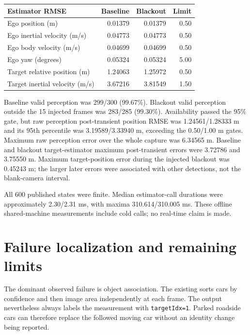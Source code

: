 \documentclass[11pt]{article}
\begin{document}
\begin{center}
\begin{tabular}{lrrr}
\toprule
Estimator RMSE & Baseline & Blackout & Limit \\
\midrule
Ego position (m) & 0.01379 & 0.01379 & 0.50 \\
Ego inertial velocity (m/s) & 0.04773 & 0.04773 & 0.50 \\
Ego body velocity (m/s) & 0.04699 & 0.04699 & 0.50 \\
Ego yaw (degrees) & 0.05324 & 0.05324 & 5.00 \\
Target relative position (m) & 1.24063 & 1.25972 & 0.50 \\
Target inertial velocity (m/s) & 3.67216 & 3.81549 & 1.50 \\
\bottomrule
\end{tabular}
\end{center}

Baseline valid perception was 299/300 (99.67\%). Blackout valid perception
outside the 15 injected frames was 283/285 (99.30\%). Availability passed
the 95\% gate, but raw perception post-transient position RMSE was
1.24561/1.28333 m and its 95th percentile was 3.19589/3.33940 m, exceeding
the 0.50/1.00 m gates. Maximum raw perception error over the whole capture
was 6.34565 m. Baseline and blackout target-estimator maximum post-transient
errors were 3.72786 and 3.75550 m. Maximum target-position error during the
injected blackout was 0.45243 m; the larger later errors were associated with
other detections, not the blank-camera interval.

All 600 published states were finite. Median estimator-call durations were
approximately 2.30/2.31 ms, with maxima 310.614/310.005 ms. These offline
shared-machine measurements include cold calls; no real-time claim is made.

\section{Failure localization and remaining limits}
The dominant observed failure is object association. The existing
 sorts cars by confidence and then image area
independently at each frame. The output nevertheless always labels the
measurement with \texttt{targetIdx=1}. Parked roadside cars can therefore
replace the followed moving car without an identity change being reported.
\end{document}
